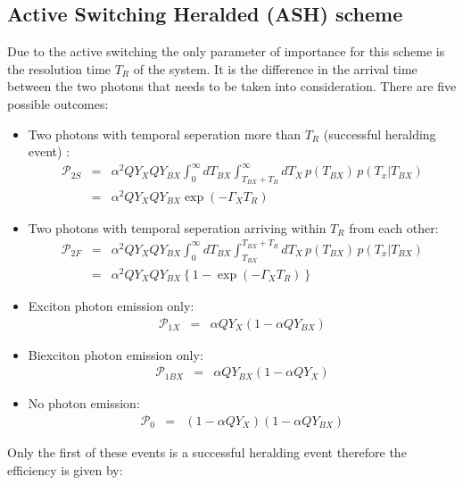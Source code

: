 \documentclass[reprint,onecolumn]{revtex4-1}
\begin{document}
\subsection{Active Switching Heralded (ASH) scheme}

Due to the active switching the only parameter of importance for this
scheme is the resolution time $T_{R}$ of the system. It is the difference
in the arrival time between the two photons that needs to be taken
into consideration. There are five possible outcomes:
\begin{itemize}
\item Two photons with temporal seperation more than $T_{R}$ (successful
heralding event) : 
\begin{eqnarray*}
\mathscr{\mathcal{\mathscr{P}}}_{2S} & = & \alpha^{2}QY_{X}QY_{BX}\int_{0}^{\infty}dT_{BX}\int_{T_{BX}+T_{R}}^{\infty}dT_{X}\,p(T_{BX})\,p\left(T_{x}\right|\left.T_{BX}\right)\\
 & = & \alpha^{2}QY_{X}QY_{BX}\exp\left(-\Gamma_{X}T_{R}\right)
\end{eqnarray*}
\item Two photons with temporal seperation arriving within $T_{R}$ from
each other:
\begin{eqnarray*}
\mathscr{\mathcal{\mathscr{P}}}_{2F} & = & \alpha^{2}QY_{X}QY_{BX}\int_{0}^{\infty}dT_{BX}\int_{T_{BX}}^{T_{BX}+T_{R}}dT_{X}\,p(T_{BX})\,p\left(T_{x}\right|\left.T_{BX}\right)\\
 & = & \alpha^{2}QY_{X}QY_{BX}\left\{ 1-\exp\left(-\Gamma_{X}T_{R}\right)\right\} 
\end{eqnarray*}
\item Exciton photon emission only:
\begin{eqnarray*}
\mathscr{\mathcal{\mathscr{P}}}_{1X} & = & \alpha QY_{X}\left(1-\alpha QY_{BX}\right)
\end{eqnarray*}
\item Biexciton photon emission only: 
\begin{eqnarray*}
\mathscr{\mathcal{\mathscr{P}}}_{1BX} & = & \alpha QY_{BX}\left(1-\alpha QY_{X}\right)
\end{eqnarray*}
\item No photon emission: 
\begin{eqnarray*}
\mathscr{\mathcal{\mathscr{P}}}_{0} & = & \left(1-\alpha QY_{X}\right)\left(1-\alpha QY_{BX}\right)
\end{eqnarray*}
\end{itemize}
Only the first of these events is a successful heralding event therefore
the efficiency is given by:
\end{document}
